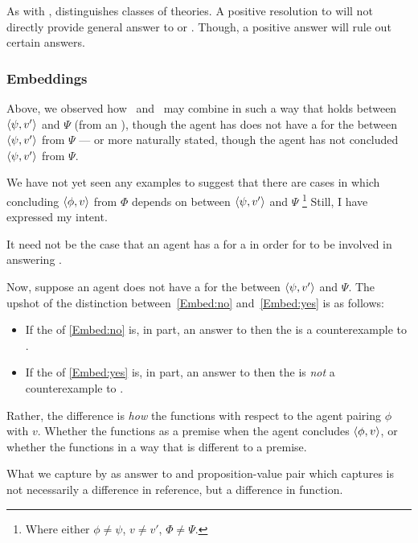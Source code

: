 \begin{note}
  As with \issueInclusion{}, \issueConstraint{} distinguishes classes of theories.
  A positive resolution to \issueInclusion{} will not directly provide general answer to \qWhy{} or \qHow{}.
  Though, a positive answer will rule out certain answers.
\end{note}

\subsubsection{Embeddings}
\label{cha:var:sec:vars:issue:embeddings}

\begin{note}
  Above, we observed how~\supportI{} and~\supportII{} may combine in such a way that \support{} holds between \(\langle \psi, v' \rangle\) and \(\Psi\) (from an \agpe{}), though the agent has does not have a  for the  between \(\langle \psi, v' \rangle\) from \(\Psi\) --- or more naturally stated, though the agent has not concluded \(\langle \psi, v' \rangle\) from \(\Psi\).

  We have not yet seen any examples to suggest that there are cases in which concluding \(\langle \phi, v \rangle\) from \(\Phi\) depends on \ros{} between \(\langle \psi, v' \rangle\) and \(\Psi\)%
  \footnote{
    Where either \(\phi \ne \psi\), \(v \ne v'\), \(\Phi \ne \Psi\).
  }
  Still, I have expressed my intent.

  It need not be the case that an agent has a  for a  in order for \ros{} to be involved in answering \qWhyVnP{}.
\end{note}

\begin{note}
  Now, suppose an agent does not have a  for the \ros{} between \(\langle \psi, v' \rangle\) and \(\Psi\).
  The upshot of the distinction between~\ref{Embed:no} and~\ref{Embed:yes} is as follows:

  \begin{itemize}
  \item
    If the  of \ref{Embed:no} is, in part, an answer to \qWhyVnP{} then the  is a counterexample to \issueConstraint{}.
  \item
    If the  of \ref{Embed:yes} is, in part, an answer to \qWhyVnP{} then the  is \emph{not} a counterexample to \issueConstraint{}.
  \end{itemize}


  Rather, the difference is \emph{how} the \ros{} functions with respect to the agent pairing \(\phi\) with \(v\).
  Whether the \ros{} functions as a premise when the agent concludes \(\langle \phi, v \rangle\), or whether the \ros{} functions in a way that is different to a premise.

  What we capture by \ros{} as answer to \qWhyVnP{} and proposition-value pair which captures \ros{} is not necessarily a difference in reference, but a difference in function.
\end{note}



